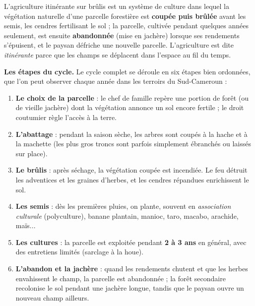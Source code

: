 \documentclass[11pt]{article}
\newcommand{\cle}[1]{{\popxbold\color{popdark}#1}}
\begin{document}
\begin{definition}
L'\cle{agriculture itinérante sur brûlis} est un système de culture dans lequel la végétation naturelle d'une parcelle forestière est \textbf{coupée puis brûlée} avant les semis, les cendres fertilisant le sol ; la parcelle, cultivée pendant quelques années seulement, est ensuite \textbf{abandonnée} (mise en jachère) lorsque ses rendements s'épuisent, et le paysan défriche une nouvelle parcelle. L'agriculture est dite \emph{itinérante} parce que les champs se déplacent dans l'espace au fil du temps.
\end{definition}

\textbf{Les étapes du cycle.} Le cycle complet se déroule en six étapes bien ordonnées, que l'on peut observer chaque année dans les terroirs du Sud-Cameroun :

\begin{enumerate}
\item \textbf{Le choix de la parcelle} : le chef de famille repère une portion de forêt (ou de vieille jachère) dont la végétation annonce un sol encore fertile ; le droit coutumier règle l'accès à la terre.
\item \textbf{L'abattage} : pendant la saison sèche, les arbres sont coupés à la hache et à la machette (les plus gros troncs sont parfois simplement ébranchés ou laissés sur place).
\item \textbf{Le brûlis} : après séchage, la végétation coupée est incendiée. Le feu détruit les adventices et les graines d'herbes, et les cendres répandues enrichissent le sol.
\item \textbf{Les semis} : dès les premières pluies, on plante, souvent en \emph{association culturale} (polyculture), banane plantain, manioc, taro, macabo, arachide, maïs...
\item \textbf{Les cultures} : la parcelle est exploitée pendant \textbf{2 à 3 ans} en général, avec des entretiens limités (sarclage à la houe).
\item \textbf{L'abandon et la jachère} : quand les rendements chutent et que les herbes envahissent le champ, la parcelle est abandonnée ; la forêt secondaire recolonise le sol pendant une jachère longue, tandis que le paysan ouvre un nouveau champ ailleurs.
\end{enumerate}
\end{document}
